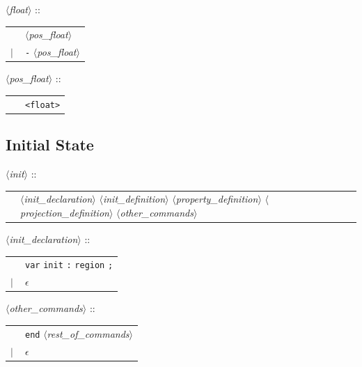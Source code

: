 \documentclass[a4paper,11pt]{report}
\newcommand{\emptystring}{$\epsilon$}
\newcommand{\nt}[1]{$\langle$\emph{#1}$\rangle$}
\newcommand{\regleGrammaire}[1]{\bigskip \noindent \nt{#1} :: \\}
\newcommand{\npec}[1]{\textcolor{green!50!black}{#1}}
\newcommand{\styleIMI}[1]{\textcolor{imicolor}{\texttt{#1}}}
\begin{document}
\regleGrammaire{float}
\begin{tabular}{l l}
	\  & \nt{pos\_float} \\
	$|$ & \styleIMI{-} \nt{pos\_float}  \\
\end{tabular}


\regleGrammaire{pos\_float}
\begin{tabular}{l l}
	\  & \styleIMI{<float>} \\
\end{tabular}


\subsection{Initial State}

\regleGrammaire{init}
\begin{tabular}{l l}
	& \npec{\nt{init\_declaration}} \nt{init\_definition} \nt{property\_definition} \nt{projection\_definition} \npec{\nt{other\_commands}} \\
\end{tabular}

\regleGrammaire{\npec{init\_declaration}}
\begin{tabular}{l l}
	\  & \npec{\styleIMI{var} \styleIMI{init} \styleIMI{:} \styleIMI{region} \styleIMI{;}} \\
	$|$ & \emptystring \\
\end{tabular}

\regleGrammaire{other\_commands}
\begin{tabular}{l l}
	\  & \styleIMI{end} \npec{\nt{rest\_of\_commands}} \\
	$|$ & \emptystring \\
\end{tabular}
\end{document}
